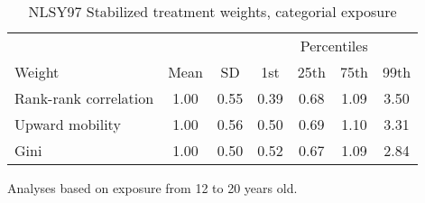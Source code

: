 \begin{table}[htp]
\centering
\footnotesize
\setlength{\tabcolsep}{10pt}
\renewcommand{\arraystretch}{1}
\begin{threeparttable}
\centering
\caption{NLSY97 Stabilized treatment weights, categorial exposure} 
\label{tab:ipt_weigths_q}
\begin{tabular}{lcccccc}
  \hline
\multicolumn{3}{c}{} & \multicolumn{4}{c}{Percentiles} \\ 
 \cmidrule{4-7} 
Weight & Mean & SD & 1st & 25th & 75th & 99th \\ 
  \hline
Rank-rank correlation & 1.00 & 0.55 & 0.39 & 0.68 & 1.09 & 3.50 \\ 
  Upward mobility & 1.00 & 0.56 & 0.50 & 0.69 & 1.10 & 3.31 \\ 
  Gini & 1.00 & 0.50 & 0.52 & 0.67 & 1.09 & 2.84 \\ 
   \hline
\end{tabular}
\begin{tablenotes}
\footnotesize
\item Analyses based on exposure from 12 to 20 years old. 
\end{tablenotes}
\end{threeparttable}
\end{table}
